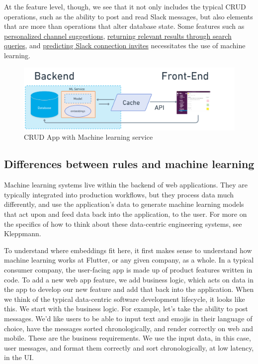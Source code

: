 \documentclass[11pt, table]{diazessay} %
\begin{document}
\begin{sloppypar}
At the feature level, though, we see that it not only includes the typical CRUD operations, such as the ability to post and read Slack messages, but also elements that are more than operations that alter database state. Some features such as \href{https://slack.engineering/personalized-channel-recommendations-in-slack/}{personalized channel suggestions}, \href{https://slack.engineering/search-at-slack/}{returning relevant results through search queries}, and \href{https://slack.engineering/email-classification/}{predicting Slack connection invites} necessitates the use of  machine learning.

\begin{figure}[H]
\centering
\includegraphics[width=\textwidth]{figures/web_service_ml.png}
\caption{CRUD App with Machine learning service}
\end{figure}

\subsection{Differences between rules and machine learning}
Machine learning systems live within the backend of web applications. They are typically integrated into production workflows, but they process data much differently, and use the application's data to generate machine learning models that act upon and feed data back into the application, to the user. For more on the specifics of how to think about these data-centric engineering systems, see Kleppmann\cite{kleppmann2017designing}.

To understand where embeddings fit here, it first  makes sense to understand how machine learning works at Flutter, or any given company, as a whole. In a typical consumer company, the user-facing app is made up of product features written in code. To add a new web app feature, we add business logic, which acts on data in the app to develop our new feature and add that back into the application.  When we think of the typical data-centric software development lifecycle, it looks like this. We start with the business logic. For example, let's take the ability to post messages. We'd like users to be able to input text and emojis in their language of choice, have the messages sorted chronologically, and render correctly on web and mobile. These are the business requirements. We use the input data, in this case, user messages, and format them correctly and sort chronologically, at low latency, in the UI.


\end{sloppypar}
\end{document}
